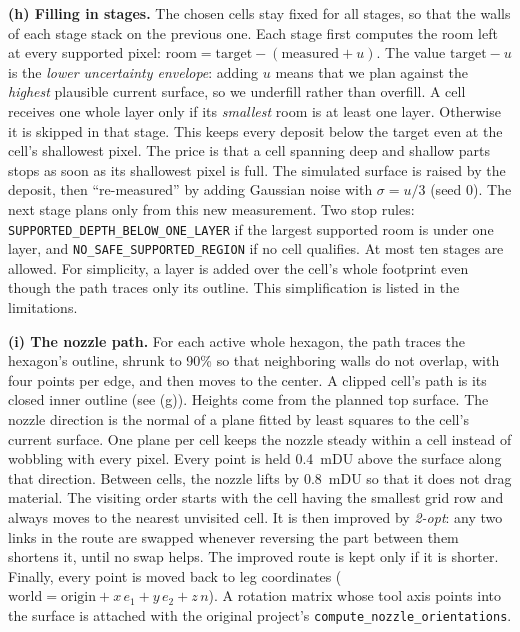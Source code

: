 \documentclass[conference]{IEEEtran}
\begin{document}
\textbf{(h) Filling in stages.} The chosen cells stay fixed for all stages,
so that the walls of each stage stack on the previous one. Each stage first
computes the room left at every supported pixel:
$\text{room} = \text{target} - (\text{measured} + u)$. The value
$\text{target}-u$ is the \emph{lower uncertainty envelope}: adding $u$ means
that we plan against the \emph{highest} plausible current surface, so we
underfill rather than overfill. A cell receives one whole layer only if its
\emph{smallest} room is at least one layer. Otherwise it is skipped in that
stage. This keeps every deposit below the target even at the cell's
shallowest pixel. The price is that a cell spanning deep and shallow parts
stops as soon as its shallowest pixel is full. The simulated surface is
raised by the deposit, then ``re-measured'' by adding Gaussian noise with
$\sigma=u/3$ (seed 0). The next stage plans only from this new measurement.
Two stop rules: \texttt{SUPPORTED\_DEPTH\_BELOW\_ONE\_LAYER} if the largest
supported room is under one layer, and \texttt{NO\_SAFE\_SUPPORTED\_REGION}
if no cell qualifies. At most ten stages are allowed. For simplicity, a
layer is added over the cell's whole footprint even though the path traces
only its outline. This simplification is listed in the limitations.

\textbf{(i) The nozzle path.} For each active whole hexagon, the path
traces the hexagon's outline, shrunk to 90\% so that neighboring walls do
not overlap, with four points per edge, and then moves to the center. A
clipped cell's path is its closed inner outline (see (g)). Heights come from
the planned top surface. The nozzle direction is the normal of a plane
fitted by least squares to the cell's current surface. One plane per cell
keeps the nozzle steady within a cell instead of wobbling with every pixel.
Every point is held 0.4~mDU above the surface along that direction.
Between cells, the nozzle lifts by 0.8~mDU so that it does not drag
material. The visiting order starts with the cell having the smallest
grid row and always moves to the nearest unvisited cell. It is then
improved by \emph{2-opt}: any two links in the route are swapped whenever
reversing the part between them shortens it, until no swap helps. The
improved route is kept only if it is shorter. Finally, every point is moved
back to leg coordinates
($\text{world} = \text{origin} + x\,e_1 + y\,e_2 + z\,n$). A rotation matrix
whose tool axis points into the surface is attached with the original
project's \texttt{compute\_nozzle\_orientations}.
\end{document}
